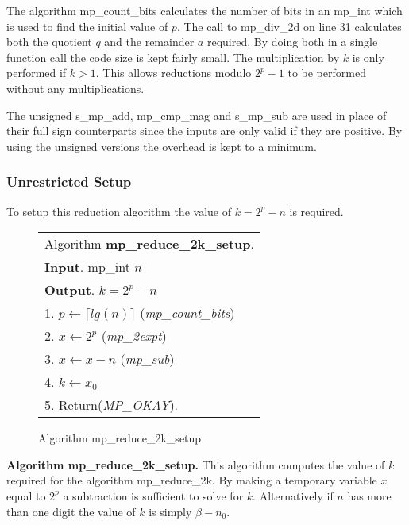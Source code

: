 \documentclass[b5paper]{book}
\begin{document}
The algorithm mp\_count\_bits calculates the number of bits in an mp\_int which is used to find the initial value of $p$.  The call to mp\_div\_2d
on line 31 calculates both the quotient $q$ and the remainder $a$ required.  By doing both in a single function call the code size
is kept fairly small.  The multiplication by $k$ is only performed if $k > 1$. This allows reductions modulo $2^p - 1$ to be performed without
any multiplications.  

The unsigned s\_mp\_add, mp\_cmp\_mag and s\_mp\_sub are used in place of their full sign counterparts since the inputs are only valid if they are 
positive.  By using the unsigned versions the overhead is kept to a minimum.  

\subsubsection{Unrestricted Setup}
To setup this reduction algorithm the value of $k = 2^p - n$ is required.  

\begin{figure}[!here]
\begin{small}
\begin{center}
\begin{tabular}{l}
\hline Algorithm \textbf{mp\_reduce\_2k\_setup}. \\
\textbf{Input}.   mp\_int $n$   \\
\textbf{Output}.  $k = 2^p - n$ \\
\hline
1.  $p \leftarrow \lceil lg(n) \rceil$  (\textit{mp\_count\_bits}) \\
2.  $x \leftarrow 2^p$ (\textit{mp\_2expt}) \\
3.  $x \leftarrow x - n$ (\textit{mp\_sub}) \\
4.  $k \leftarrow x_0$ \\
5.  Return(\textit{MP\_OKAY}). \\
\hline
\end{tabular}
\end{center}
\end{small}
\caption{Algorithm mp\_reduce\_2k\_setup}
\end{figure}

\textbf{Algorithm mp\_reduce\_2k\_setup.}
This algorithm computes the value of $k$ required for the algorithm mp\_reduce\_2k.  By making a temporary variable $x$ equal to $2^p$ a subtraction
is sufficient to solve for $k$.  Alternatively if $n$ has more than one digit the value of $k$ is simply $\beta - n_0$.  
\end{document}
